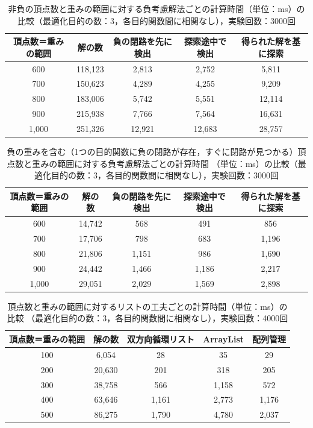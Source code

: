 \documentclass[12pt]{optlab-bachelor}
\begin{document}
\begin{table}[h]
  \centering
  \caption{非負の頂点数と重みの範囲に対する負考慮解法ごとの計算時間（単位：ms）の比較（最適化目的の数：3，各目的関数間に相関なし），実験回数：3000回}
  {\small
  \begin{tabular}{|c|c|c|c|c|} \hline
    頂点数＝重みの範囲 & 解の数 & 負の閉路を先に検出 & 探索途中で検出 & 得られた解を基に探索 \\ \hline
    600 & 118,123 & 2,813 & 2,752 & 5,811 \\ \hline
    700 & 150,623 & 4,289 & 4,255 & 9,209 \\ \hline
    800 & 183,006 & 5,742 & 5,551 & 12,114 \\ \hline
    900 & 215,938 & 7,766 & 7,564 & 16,631 \\ \hline
    1,000 & 251,326 & 12,921 & 12,683 & 28,757 \\ \hline
  \end{tabular}
  }
\end{table}

\begin{table}[h]
  \centering
  \caption{負の重みを含む（1つの目的関数に負の閉路が存在，すぐに閉路が見つかる）頂点数と重みの範囲に対する負考慮解法ごとの計算時間
  （単位：ms）の比較（最適化目的の数：3，各目的関数間に相関なし），実験回数：3000回}
  {\small
  \begin{tabular}{|c|c|c|c|c|} \hline
    頂点数＝重みの範囲 & 解の数 & 負の閉路を先に検出 & 探索途中で検出 & 得られた解を基に探索 \\ \hline
    600 & 14,742 & 568 & 491 & 856 \\ \hline
    700 & 17,706 & 798 & 683 & 1,196 \\ \hline
    800 & 21,806 & 1,151 & 986 & 1,690 \\ \hline
    900 & 24,442 & 1,466 & 1,186 & 2,217 \\ \hline
    1,000 & 29,051 & 2,029 & 1,569 & 2,898 \\ \hline
  \end{tabular}
  }
\end{table}


\begin{table}[h]
  \centering
  \caption{頂点数と重みの範囲に対するリストの工夫ごとの計算時間（単位：ms）の比較
  （最適化目的の数：3，各目的関数間に相関なし），実験回数：4000回}
  {\small
  \begin{tabular}{|c|c|c|c|c|} \hline
    頂点数＝重みの範囲 & 解の数 & 双方向循環リスト & ArrayList & 配列管理 \\ \hline
    100 & 6,054 & 28 & 35 & 29 \\ \hline
    200 & 20,630 & 201 & 318 & 205 \\ \hline
    300 & 38,758 & 566 & 1,158 & 572 \\ \hline
    400 & 63,646 & 1,161 & 2,773 & 1,176 \\ \hline
    500 & 86,275 & 1,790 & 4,780 & 2,037 \\ \hline
  \end{tabular}
  }
\end{table}
\end{document}
